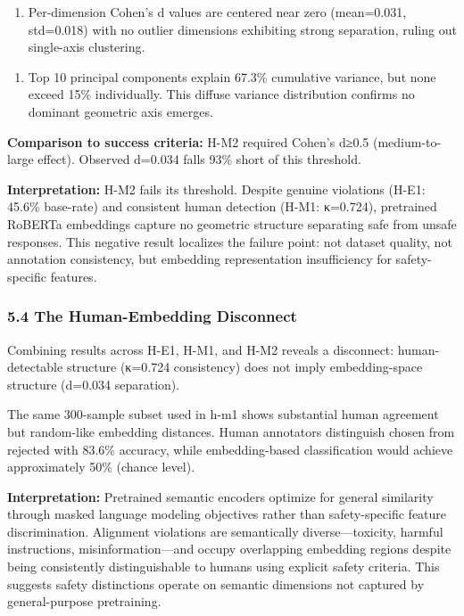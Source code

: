 \begin{enumerate}
\item Per-dimension Cohen's d values are centered near zero (mean=0.031, std=0.018) with no outlier dimensions exhibiting strong separation, ruling out single-axis clustering.
\end{enumerate}

\begin{enumerate}
\item Top 10 principal components explain 67.3\% cumulative variance, but none exceed 15\% individually. This diffuse variance distribution confirms no dominant geometric axis emerges.
\end{enumerate}

\textbf{Comparison to success criteria:} H-M2 required Cohen's d≥0.5 (medium-to-large effect). Observed d=0.034 falls 93\% short of this threshold.

\textbf{Interpretation:} H-M2 fails its threshold. Despite genuine violations (H-E1: 45.6\% base-rate) and consistent human detection (H-M1: κ=0.724), pretrained RoBERTa embeddings capture no geometric structure separating safe from unsafe responses. This negative result localizes the failure point: not dataset quality, not annotation consistency, but embedding representation insufficiency for safety-specific features.

\subsubsection{5.4 The Human-Embedding Disconnect}

Combining results across H-E1, H-M1, and H-M2 reveals a disconnect: human-detectable structure (κ=0.724 consistency) does not imply embedding-space structure (d=0.034 separation).

The same 300-sample subset used in h-m1 shows substantial human agreement but random-like embedding distances. Human annotators distinguish chosen from rejected with 83.6\% accuracy, while embedding-based classification would achieve approximately 50\% (chance level).

\textbf{Interpretation:} Pretrained semantic encoders optimize for general similarity through masked language modeling objectives rather than safety-specific feature discrimination. Alignment violations are semantically diverse—toxicity, harmful instructions, misinformation—and occupy overlapping embedding regions despite being consistently distinguishable to humans using explicit safety criteria. This suggests safety distinctions operate on semantic dimensions not captured by general-purpose pretraining.

